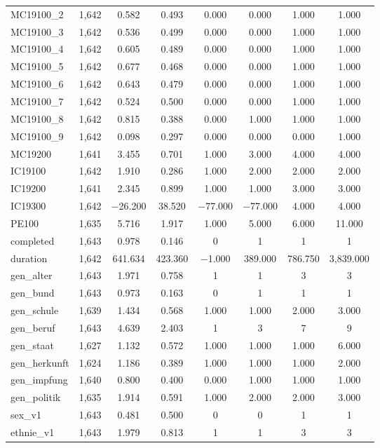 \begin{table}[!htbp]
\begin{tabular}{@{\extracolsep{5pt}}lccccccc}
MC19100\_2 & 1,642 & 0.582 & 0.493 & 0.000 & 0.000 & 1.000 & 1.000 \\ 
MC19100\_3 & 1,642 & 0.536 & 0.499 & 0.000 & 0.000 & 1.000 & 1.000 \\ 
MC19100\_4 & 1,642 & 0.605 & 0.489 & 0.000 & 0.000 & 1.000 & 1.000 \\ 
MC19100\_5 & 1,642 & 0.677 & 0.468 & 0.000 & 0.000 & 1.000 & 1.000 \\ 
MC19100\_6 & 1,642 & 0.643 & 0.479 & 0.000 & 0.000 & 1.000 & 1.000 \\ 
MC19100\_7 & 1,642 & 0.524 & 0.500 & 0.000 & 0.000 & 1.000 & 1.000 \\ 
MC19100\_8 & 1,642 & 0.815 & 0.388 & 0.000 & 1.000 & 1.000 & 1.000 \\ 
MC19100\_9 & 1,642 & 0.098 & 0.297 & 0.000 & 0.000 & 0.000 & 1.000 \\ 
MC19200 & 1,641 & 3.455 & 0.701 & 1.000 & 3.000 & 4.000 & 4.000 \\ 
IC19100 & 1,642 & 1.910 & 0.286 & 1.000 & 2.000 & 2.000 & 2.000 \\ 
IC19200 & 1,641 & 2.345 & 0.899 & 1.000 & 1.000 & 3.000 & 3.000 \\ 
IC19300 & 1,642 & $-$26.200 & 38.520 & $-$77.000 & $-$77.000 & 4.000 & 4.000 \\ 
PE100 & 1,635 & 5.716 & 1.917 & 1.000 & 5.000 & 6.000 & 11.000 \\ 
completed & 1,643 & 0.978 & 0.146 & 0 & 1 & 1 & 1 \\ 
duration & 1,642 & 641.634 & 423.360 & $-$1.000 & 389.000 & 786.750 & 3,839.000 \\ 
gen\_alter & 1,643 & 1.971 & 0.758 & 1 & 1 & 3 & 3 \\ 
gen\_bund & 1,643 & 0.973 & 0.163 & 0 & 1 & 1 & 1 \\ 
gen\_schule & 1,639 & 1.434 & 0.568 & 1.000 & 1.000 & 2.000 & 3.000 \\ 
gen\_beruf & 1,643 & 4.639 & 2.403 & 1 & 3 & 7 & 9 \\ 
gen\_staat & 1,627 & 1.132 & 0.572 & 1.000 & 1.000 & 1.000 & 6.000 \\ 
gen\_herkunft & 1,624 & 1.186 & 0.389 & 1.000 & 1.000 & 1.000 & 2.000 \\ 
gen\_impfung & 1,640 & 0.800 & 0.400 & 0.000 & 1.000 & 1.000 & 1.000 \\ 
gen\_politik & 1,635 & 1.914 & 0.591 & 1.000 & 2.000 & 2.000 & 3.000 \\ 
sex\_v1 & 1,643 & 0.481 & 0.500 & 0 & 0 & 1 & 1 \\ 
ethnie\_v1 & 1,643 & 1.979 & 0.813 & 1 & 1 & 3 & 3 \\ 

\end{tabular}
\end{table}
